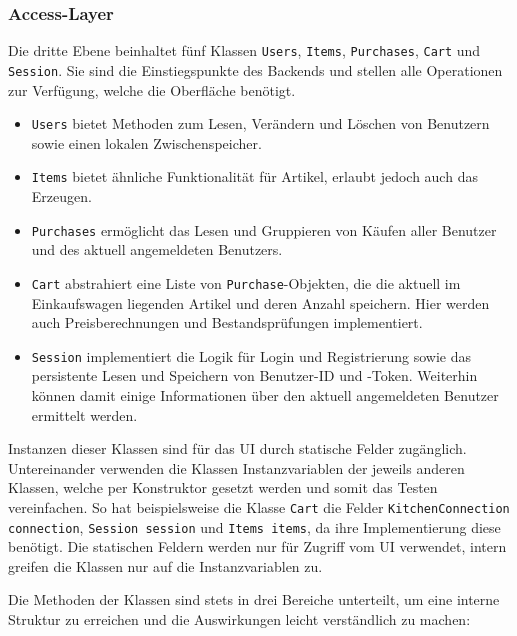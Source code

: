 \subsubsection{Access-Layer} \label{subsubsec:access-layer}

Die dritte Ebene beinhaltet fünf Klassen \texttt{Users}, \texttt{Items}, \texttt{Purchases}, \texttt{Cart} und \texttt{Session}.
Sie sind die Einstiegspunkte des Backends und stellen alle Operationen zur Verfügung, welche die Oberfläche benötigt.

\begin{itemize}
	\item \texttt{Users} bietet Methoden zum Lesen, Verändern und Löschen von Benutzern sowie einen lokalen Zwischenspeicher.
	\item \texttt{Items} bietet ähnliche Funktionalität für Artikel, erlaubt jedoch auch das Erzeugen.
	\item \texttt{Purchases} ermöglicht das Lesen und Gruppieren von Käufen aller Benutzer und des aktuell angemeldeten Benutzers.
	\item \texttt{Cart} abstrahiert eine Liste von \texttt{Purchase}-Objekten, die die aktuell im Einkaufswagen liegenden Artikel und deren Anzahl speichern.
	Hier werden auch Preisberechnungen und Bestandsprüfungen implementiert.
	\item \texttt{Session} implementiert die Logik für Login und Registrierung sowie das persistente Lesen und Speichern von Benutzer-ID und -Token.
	Weiterhin können damit einige Informationen über den aktuell angemeldeten Benutzer ermittelt werden.
\end{itemize}

Instanzen dieser Klassen sind für das UI durch statische Felder zugänglich.
Untereinander verwenden die Klassen Instanzvariablen der jeweils anderen Klassen, welche per Konstruktor gesetzt werden und somit das Testen vereinfachen.
So hat beispielsweise die Klasse \texttt{Cart} die Felder \texttt{KitchenConnection connection}, \texttt{Session session} und \texttt{Items items}, da ihre Implementierung diese benötigt.
Die statischen Feldern werden nur für Zugriff vom UI verwendet, intern greifen die Klassen nur auf die Instanzvariablen zu.

Die Methoden der Klassen sind stets in drei Bereiche unterteilt, um eine interne Struktur zu erreichen und die Auswirkungen leicht verständlich zu machen:

